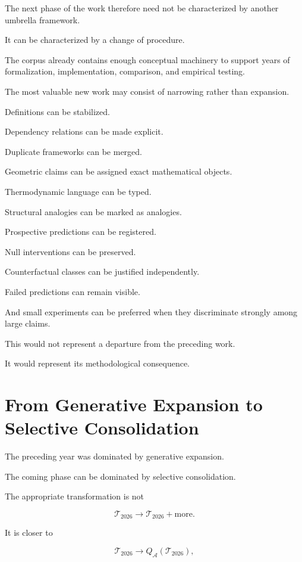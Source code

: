 \documentclass[11pt]{article}
\theoremstyle{remark}
\newcommand{\Adm}{\mathcal{A}}
\begin{document}
The next phase of the work therefore need not be characterized by another
umbrella framework.

It can be characterized by a change of procedure.

The corpus already contains enough conceptual machinery to support years of
formalization, implementation, comparison, and empirical testing.

The most valuable new work may consist of narrowing rather than expansion.

Definitions can be stabilized.

Dependency relations can be made explicit.

Duplicate frameworks can be merged.

Geometric claims can be assigned exact mathematical objects.

Thermodynamic language can be typed.

Structural analogies can be marked as analogies.

Prospective predictions can be registered.

Null interventions can be preserved.

Counterfactual classes can be justified independently.

Failed predictions can remain visible.

And small experiments can be preferred when they discriminate strongly among
large claims.

This would not represent a departure from the preceding work.

It would represent its methodological consequence.

\section{From Generative Expansion to Selective Consolidation}

The preceding year was dominated by generative expansion.

The coming phase can be dominated by selective consolidation.

The appropriate transformation is not

\begin{equation}
\mathcal{T}_{2026}
\rightarrow
\mathcal{T}_{2026}
+
\text{more}.
\end{equation}

It is closer to

\begin{equation}
\mathcal{T}_{2026}
\rightarrow
Q_{\Adm}(\mathcal{T}_{2026}),
\end{equation}
\end{document}
